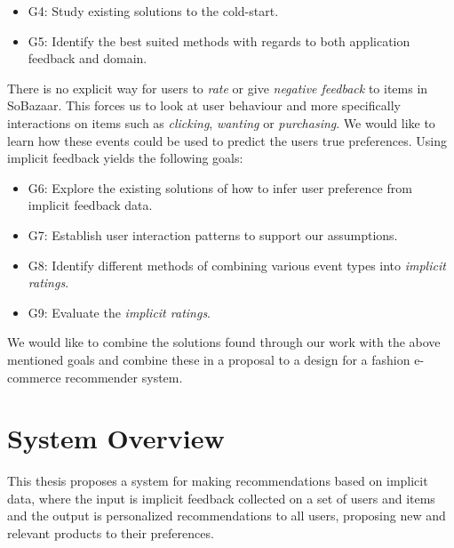 \begin{itemize}
  \item G4: Study existing solutions to the cold-start.
  \item G5: Identify the best suited methods with regards to both application
  feedback and domain. 
\end{itemize}

There is no explicit way for users to \textit{rate} or give \textit{negative
feedback} to items in SoBazaar. This forces us to look at user behaviour and
more specifically interactions on items such as \textit{clicking},
\textit{wanting} or \textit{purchasing}. We would like to learn how these
events could be used to predict the users true preferences. Using implicit
feedback yields the following goals:

\begin{itemize}
  \item G6: Explore the existing solutions of how to infer user preference from
  implicit feedback data.
  \item G7: Establish user interaction patterns to support our assumptions.
  \item G8: Identify different methods of combining various event types into
  \emph{implicit ratings}.
  \item G9: Evaluate the \emph{implicit ratings}.
\end{itemize}

We would like to combine the solutions found through our work with the above
mentioned goals and combine these in a proposal to a design for a fashion
e-commerce recommender system.

\section{System Overview}

  
  This thesis proposes a system for making recommendations based on implicit
  data, where the input is implicit feedback collected on a set of users and
  items and the output is personalized recommendations to all users, proposing
  new and relevant products to their preferences.
 
